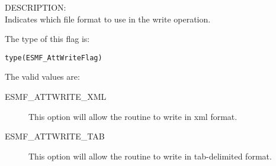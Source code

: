 {\sf DESCRIPTION:\\}
Indicates which file format to use in the write operation.

The type of this flag is:

{\tt type(ESMF\_AttWriteFlag)}

The valid values are:
\begin{description}
	\item[ESMF\_ATTWRITE\_XML]
	This option will allow the routine to write in xml format.
	\item[ESMF\_ATTWRITE\_TAB]
	This option will allow the routine to write in tab-delimited format.
\end{description}

